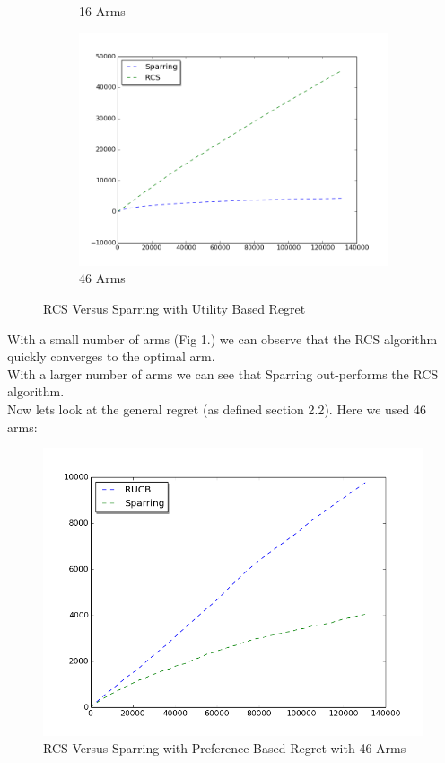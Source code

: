 \documentclass{llncs}
\begin{document}
\begin{figure}[h!]
\begin{subfigure}{.5\textwidth}
  \caption{16 Arms}
  \label{fig:sub2}
\end{subfigure}
\begin{subfigure}{.5\textwidth}
  \centering
  \includegraphics[scale=0.3, natwidth=410,natheight=442]{figures/rcs_sparring_MQ2007_46arms.png}
  \caption{46 Arms}
  \label{fig:sub2}
\end{subfigure}
\caption{RCS Versus Sparring with Utility Based Regret}
\label{fig:test}
\end{figure}


With a small number of arms (Fig 1.) we can observe that the RCS algorithm quickly converges to the optimal arm.
\\
With a larger number of arms we can see that Sparring out-performs the RCS algorithm. 
\\
Now lets look at the general regret (as defined section 2.2). Here we used 46 arms:
\begin{figure}[h!]
  \centering
     \includegraphics[scale=0.4, natwidth=410,natheight=442]{figures/rcs_sparring_MQ2007_general.png} 
  \caption{RCS Versus Sparring with Preference Based Regret with 46 Arms}
\end{figure}
\end{document}

